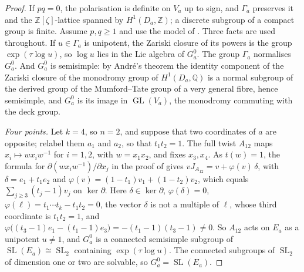 \documentclass[11pt,reqno]{amsart}
\theoremstyle{plain}
\theoremstyle{definition}
\theoremstyle{remark}
\newcommand{\QQ}{\mathbb{Q}}
\newcommand{\ZZ}{\mathbb{Z}}
\DeclareMathOperator{\GL}{GL}
\DeclareMathOperator{\SL}{SL}
\begin{document}
\begin{proof}
If $pq=0$, the polarisation is definite on $V_{a}$ up to sign, and
$\Gamma_{a}$ preserves it and the $\ZZ[\zeta]$-lattice spanned by
$H^{1}(D_{a},\ZZ)$; a discrete subgroup of a compact group is finite. Assume
$p,q\ge1$ and use the model of . Three facts are used
throughout. If $u\in\Gamma_{a}$ is unipotent, the Zariski closure of its
powers is the group $\exp(\tau\log u)$, so $\log u$ lies in the Lie algebra
of $G_{a}^{0}$. The group $\Gamma_{a}$ normalises $G_{a}^{0}$. And $G_{a}^{0}$
is semisimple: by Andr\'e's theorem \cite[Theorem~1]{And92} the identity
component of the Zariski closure of the monodromy group of
$H^{1}(D_{a},\QQ)$ is a normal subgroup of the derived group of the
Mumford--Tate group of a very general fibre, hence semisimple, and
$G_{a}^{0}$ is its image in $\GL(V_{a})$, the monodromy commuting with the
deck group.

\emph{Four points.} Let $k=4$, so $n=2$, and suppose that two coordinates
of $a$ are opposite; relabel them $a_{1}$ and $a_{2}$, so that $t_{1}t_{2}=1$.
The full twist $A_{12}$ maps $x_{i}\mapsto wx_{i}w^{-1}$ for $i=1,2$, with
$w=x_{1}x_{2}$, and fixes $x_{3},x_{4}$. As $t(w)=1$, the formula for
$\partial(wx_{i}w^{-1})/\partial x_{j}$ in the proof of 
gives $vJ_{A_{12}}=v+\varphi(v)\,\delta$, with $\delta=e_{1}+t_{1}e_{2}$ and
$\varphi(v)=(1-t_{1})v_{1}+(1-t_{2})v_{2}$, which equals
$\sum_{j\ge3}(t_{j}-1)v_{j}$ on $\ker\partial$. Here $\delta\in\ker\partial$,
$\varphi(\delta)=0$, $\varphi(\ell)=t_{1}\cdots t_{k}-t_{1}t_{2}=0$, the
vector $\delta$ is not a multiple of $\ell$, whose third coordinate is
$t_{1}t_{2}=1$, and $\varphi\bigl((t_{3}-1)e_{1}-(t_{1}-1)e_{3}\bigr)
=-(t_{1}-1)(t_{3}-1)\ne0$. So $A_{12}$ acts on $E_{a}$ as a unipotent
$u\ne1$, and $G_{a}^{0}$ is a connected semisimple subgroup of
$\SL(E_{a})\cong\SL_{2}$ containing $\exp(\tau\log u)$. The connected
subgroups of $\SL_{2}$ of dimension one or two are solvable, so
$G_{a}^{0}=\SL(E_{a})$.


\end{proof}
\end{document}
